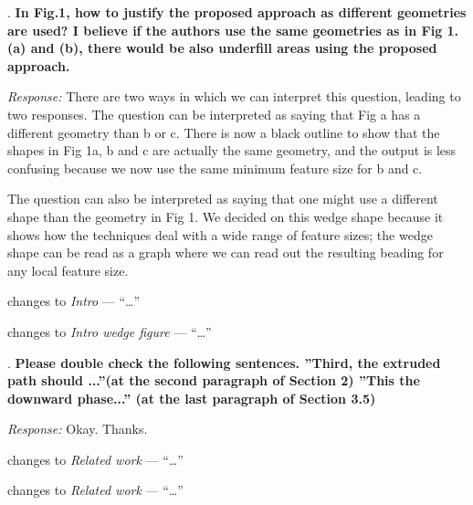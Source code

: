 \documentclass[5p,twocolumn,10pt,times]{elsarticle}
\theoremstyle{definition}
\newcommand{\stkout}[1]{\ifmmode\text{\sout{\ensuremath{#1}}}\else\sout{#1}\fi}
\newcommand{\revise}[2]{\noindent{\color{red}{\stkout{#1}}}\noindent{\color{blue}{#2}}}
\newcommand{\commits}[1]{{\bf\begin{alltt} {#1}\end{alltt}}}
\renewcommand{\commits}[1]{}
\newcommand\paper[2]{\par changes to \emph{#1} --- ``#2'' }
\renewcommand\paper[2]{\par changes to \emph{#1} --- ``\dots'' }
\newcommand\Que[1]{%
   \leavevmode\par
   \stepcounter{question}
   \noindent
   \thequestion. {\bf#1}\par}
\newcounter{question}
\numberwithin{question}{section}
\newcommand\Ans[2][]{%
    \leavevmode\par\noindent
   {%
    {\it Response:} \textbf{#1}#2\par}}
\begin{document}
\Que{
\label{fig1geometry}
In Fig.1, how to justify the proposed approach as different geometries are used? I believe if the authors use the same geometries as in Fig 1. (a) and (b), there would be also underfill areas using the proposed approach. 
}
\Ans{
There are two ways in which we can interpret this question, leading to two responses.
The question can be interpreted as saying that Fig a has a different geometry than b or c.
There is now a black outline to show that the shapes in Fig 1a, b and c are actually the same geometry, and the output is less confusing because we now use the same minimum feature size for b and c.

The question can also be interpreted as saying that one might use a different shape than the geometry in Fig 1.
We decided on this wedge shape because it shows how the techniques deal with a wide range of feature sizes;
the wedge shape can be read as a graph where we can read out the resulting beading for any local feature size.
}
\commits{45853e8b30d93f60e9465cbb649e347f9cfc23b1 53224c04ceff6c1b18a9eea6de8e7e33957b7797}
\paper{Intro}{
Illustration of different toolpath\revise{}{s} for a \revise{wedge }{}shape \revise{}{showcasing a range of shape radii }\revise{}{(black)}.
}
\paper{Intro wedge figure}{
\revise{}{These results can be read as a graph with feature size on the horizontal axis and its corresponding beading along the vertical axis.}
}



\Que{
Please double check the following sentences. ”Third, the extruded path should ...”(at the second paragraph of Section 2) ”This the downward phase...” (at the last paragraph of Section 3.5) 
}
\Ans{
Okay. Thanks.
}
\commits{eb2a5207c83dfe069d3ab3fc37bf2149b8a51964}
\paper{Related work}{
Third, the extruded path should cover \revise{a }{}the region of the contour without gaps.
}
\paper{Related work}{
\revise{This the}{The} downward phase makes sure that all nodes have a beading associated with it, so that the slicing algorithm can efficiently slice the edges leading up to a marked or unmarked node.  
}
\end{document}
